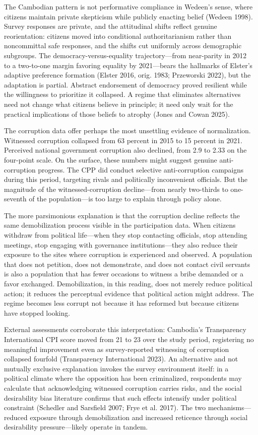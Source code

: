 \documentclass[
  12pt,
  letterpaper]{article}
\begin{document}
The Cambodian pattern is not performative compliance in Wedeen's sense,
where citizens maintain private skepticism while publicly enacting
belief (Wedeen 1998). Survey responses are private, and the attitudinal
shifts reflect genuine reorientation: citizens moved into conditional
authoritarianism rather than noncommittal safe responses, and the shifts
cut uniformly across demographic subgroups. The
democracy-versus-equality trajectory---from near-parity in 2012 to a
two-to-one margin favoring equality by 2021---bears the hallmarks of
Elster's adaptive preference formation (Elster 2016, orig. 1983;
Przeworski 2022), but the adaptation is partial. Abstract endorsement of
democracy proved resilient while the willingness to prioritize it
collapsed. A regime that eliminates alternatives need not change what
citizens believe in principle; it need only wait for the practical
implications of those beliefs to atrophy (Jones and Cowan 2025).

The corruption data offer perhaps the most unsettling evidence of
normalization. Witnessed corruption collapsed from 63 percent in 2015 to
15 percent in 2021. Perceived national government corruption also
declined, from 2.9 to 2.33 on the four-point scale. On the surface,
these numbers might suggest genuine anti-corruption progress. The CPP
did conduct selective anti-corruption campaigns during this period,
targeting rivals and politically inconvenient officials. But the
magnitude of the witnessed-corruption decline---from nearly two-thirds
to one-seventh of the population---is too large to explain through
policy alone.

The more parsimonious explanation is that the corruption decline
reflects the same demobilization process visible in the participation
data. When citizens withdraw from political life---when they stop
contacting officials, stop attending meetings, stop engaging with
governance institutions---they also reduce their exposure to the sites
where corruption is experienced and observed. A population that does not
petition, does not demonstrate, and does not contact civil servants is
also a population that has fewer occasions to witness a bribe demanded
or a favor exchanged. Demobilization, in this reading, does not merely
reduce political action; it reduces the perceptual evidence that
political action might address. The regime becomes less corrupt not
because it has reformed but because citizens have stopped looking.

External assessments corroborate this interpretation: Cambodia's
Transparency International CPI score moved from 21 to 23 over the study
period, registering no meaningful improvement even as survey-reported
witnessing of corruption collapsed fourfold (Transparency International
2023). An alternative and not mutually exclusive explanation invokes the
survey environment itself: in a political climate where the opposition
has been criminalized, respondents may calculate that acknowledging
witnessed corruption carries risks, and the social desirability bias
literature confirms that such effects intensify under political
constraint (Schedler and Sarsfield 2007; Frye et al. 2017). The two
mechanisms---reduced exposure through demobilization and increased
reticence through social desirability pressure---likely operate in
tandem.
\end{document}
